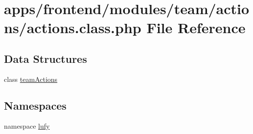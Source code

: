 \hypertarget{frontend_2modules_2team_2actions_2actions_8class_8php}{\section{apps/frontend/modules/team/actions/actions.class.\-php File Reference}
\label{frontend_2modules_2team_2actions_2actions_8class_8php}
}
\subsection*{Data Structures}
\begin{DoxyCompactItemize}
\item 
class \hyperlink{classteam_actions}{team\-Actions}
\end{DoxyCompactItemize}
\subsection*{Namespaces}
\begin{DoxyCompactItemize}
\item 
namespace \hyperlink{namespacelufy}{lufy}
\end{DoxyCompactItemize}

